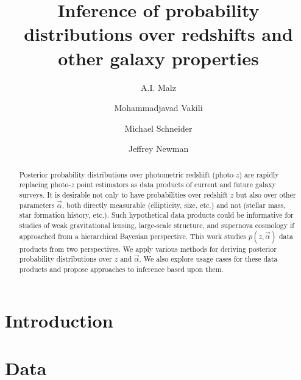 \documentclass[12pt, preprint]{aastex}
\begin{document}
\title{Inference of probability distributions over redshifts and other galaxy properties}

\author{A.I. Malz}
\author{Mohammadjavad Vakili}
\author{Michael Schneider}
\author{Jeffrey Newman}



\begin{abstract}
Posterior probability distributions over photometric redshift (photo-$z$) are rapidly replacing photo-$z$ point estimators as data products of current and future galaxy surveys.  It is desirable not only to have probabilities over redshift $z$ but also over other parameters $\vec{\alpha}$, both directly measurable (ellipticity, size, etc.) and not (stellar mass, star formation history, etc.).  Such hypothetical data products could be informative for studies of weak gravitational lensing, large-scale structure, and supernova cosmology if approached from a hierarchical Bayesian perspective.  This work studies $p(z,\vec{\alpha})$ data products from two perspectives.  We apply various methods for deriving posterior probability distributions over $z$ and $\vec{\alpha}$.  We also explore usage cases for these data products and propose approaches to inference based upon them.
\end{abstract}

\section{Introduction}

\section{Data}
\end{document}
